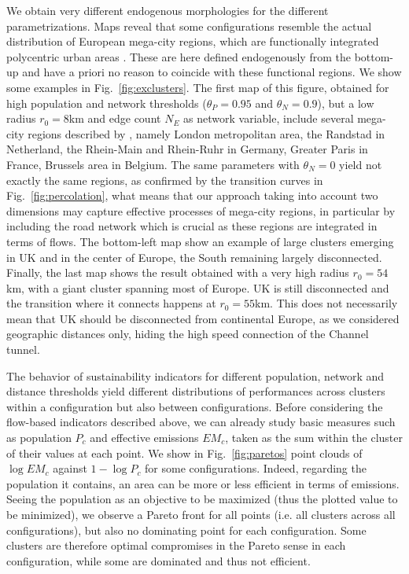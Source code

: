 \documentclass{jimis-en}
\begin{document}
We obtain very different endogenous morphologies for the different parametrizations. Maps reveal that some configurations resemble the actual distribution of European mega-city regions, which are functionally integrated polycentric urban areas \citep{hall2006polycentric}. These are here defined endogenously from the bottom-up and have a priori no reason to coincide with these functional regions. We show some examples in Fig.~\ref{fig:exclusters}. The first map of this figure, obtained for high population and network thresholds ($\theta_P = 0.95$ and $\theta_N = 0.9$), but a low radius $r_0 = 8$km and edge count $N_E$ as network variable, include several mega-city regions described by \citep{hall2006polycentric}, namely London metropolitan area, the Randstad in Netherland, the Rhein-Main and Rhein-Ruhr in Germany, Greater Paris in France, Brussels area in Belgium. The same parameters with $\theta_N = 0$ yield not exactly the same regions, as confirmed by the transition curves in Fig.~\ref{fig:percolation}, what means that our approach taking into account two dimensions may capture effective processes of mega-city regions, in particular by including the road network which is crucial as these regions are integrated in terms of flows. The bottom-left map show an example of large clusters emerging in UK and in the center of Europe, the South remaining largely disconnected. Finally, the last map shows the result obtained with a very high radius $r_0 = 54$km, with a giant cluster spanning most of Europe. UK is still disconnected and the transition where it connects happens at $r_0 = 55$km. This does not necessarily mean that UK should be disconnected from continental Europe, as we considered geographic distances only, hiding the high speed connection of the Channel tunnel.


The behavior of sustainability indicators for different population, network and distance thresholds yield different distributions of performances across clusters within a configuration but also between configurations. Before considering the flow-based indicators described above, we can already study basic measures such as population $P_c$ and effective emissions $EM_c$, taken as the sum within the cluster of their values at each point. We show in Fig.~\ref{fig:paretos} point clouds of $\log EM_c$ against $1 - \log P_c$ for some configurations. Indeed, regarding the population it contains, an area can be more or less efficient in terms of emissions. Seeing the population as an objective to be maximized (thus the plotted value to be minimized), we observe a Pareto front for all points (i.e. all clusters across all configurations), but also no dominating point for each configuration. Some clusters are therefore optimal compromises in the Pareto sense in each configuration, while some are dominated and thus not efficient.
\end{document}
